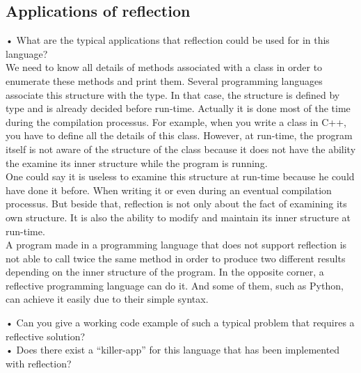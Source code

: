 \subsection{Applications of reflection}
•	What are the typical applications that reflection could be used for in this language?\\

We need to know all details of methods associated with a class in order to enumerate these methods and print them. Several programming languages associate this structure with the type. In that case, the structure is defined by type and is already decided before run-time. Actually it is done most of the time during the compilation processus. For example, when you write a class in C++, you have to define all the details of this class. However, at run-time, the program itself is not aware of the structure of the class because it does not have the ability the examine its inner structure while the program is running.\\
One could say it is useless to examine this structure at run-time because he could have done it before. When writing it or even during an eventual compilation processus. But beside that, reflection is not only about the fact of examining its own structure. It is also the ability to modify and maintain its inner structure at run-time.\\
A program made in a programming language that does not support reflection is not able to call twice the same method in order to produce two different results depending on the inner structure of the program. In the opposite corner, a reflective programming language can do it. And some of them, such as Python, can achieve it easily due to their simple syntax. \cite{assembleforce}
\newline


•	Can you give a working code example of such a typical problem that requires a reflective solution?\\







•	Does there exist a “killer-app” for this language that has been implemented with reflection?\\

